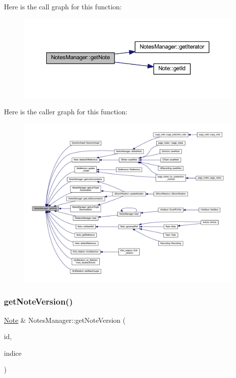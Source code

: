 Here is the call graph for this function\+:\nopagebreak
\begin{figure}[H]
\begin{center}
\leavevmode
\includegraphics[width=350pt]{class_notes_manager_a9c401bfe7c91ab37a7c8c4db398e92ff_cgraph}
\end{center}
\end{figure}
Here is the caller graph for this function\+:\nopagebreak
\begin{figure}[H]
\begin{center}
\leavevmode
\includegraphics[width=350pt]{class_notes_manager_a9c401bfe7c91ab37a7c8c4db398e92ff_icgraph}
\end{center}
\end{figure}
\mbox{\label{class_notes_manager_a0461145357fe17bf07c3b09c665b95db}} 
\subsubsection{\texorpdfstring{get\+Note\+Version()}{getNoteVersion()}}
{\footnotesize\ttfamily \hyperlink{class_note}{Note} \& Notes\+Manager\+::get\+Note\+Version (\begin{DoxyParamCaption}\item[{const Q\+String \&}]{id,  }\item[{int}]{indice }\end{DoxyParamCaption})}



